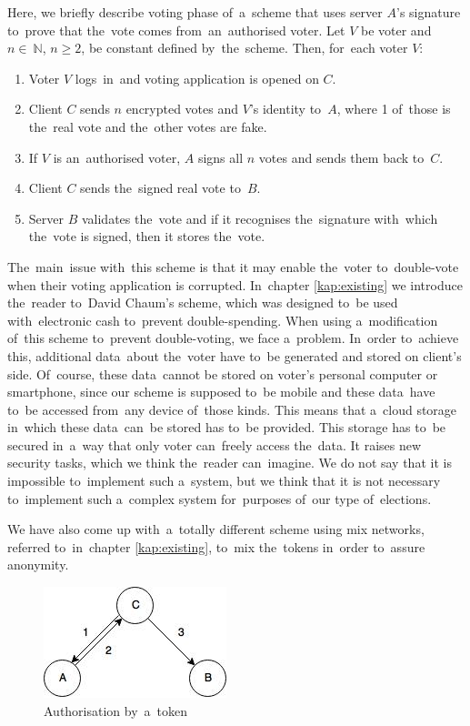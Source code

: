 Here, we briefly describe voting phase of~a~scheme that uses server $A$'s signature to~prove that the~vote comes from~an~authorised voter. 
\bigbreak
Let $V$ be voter and $n \in~\mathbb{N}$, $n \ge 2$, be constant defined by~the~scheme. Then, for~each voter $V$:
\begin{enumerate}
\item Voter $V$ logs~in~and voting application is opened on $C$.
\item Client $C$ sends $n$ encrypted votes and $V$'s identity to~$A$, where 1 of~those is the~real vote and the~other votes are fake.
\item If $V$ is an~authorised voter, $A$ signs all $n$ votes and sends them back to~$C$.
\item Client $C$ sends the~signed real vote to~$B$.
\item Server $B$ validates the~vote and if it recognises the~signature with~which the~vote is signed, then it stores the~vote.
\end{enumerate}

The~main~issue with~this scheme is that it may enable the~voter to~double-vote when their voting application is corrupted. In~chapter \ref{kap:existing} we introduce the~reader to~David Chaum's scheme, which was designed to~be used with~electronic cash to~prevent double-spending. When using a~modification of~this scheme to~prevent double-voting, we face a~problem. In~order to~achieve this, additional data~about the~voter have to~be generated and stored on client's side. Of~course, these data~cannot be stored on voter's personal computer or smartphone, since our scheme is supposed to~be mobile and these data~have to~be accessed from~any device of~those kinds. This means that a~cloud storage in~which these data~can~be stored has to~be provided. This storage has to~be secured in~a~way that only voter can~freely access the~data. It raises new security tasks, which we think the~reader can~imagine. We do not say that it is impossible to~implement such a~system, but we think that it is not necessary to~implement such a~complex system for~purposes of~our type of~elections.

We have also come up with~a~totally different scheme using mix networks, referred to~in~chapter \ref{kap:existing}, to~mix the~tokens in~order to~assure anonymity.

\begin{figure}[h]
\begin{center}
\includegraphics{images/PE2}
\caption{Authorisation by~a~token}
\end{center}
\end{figure}

